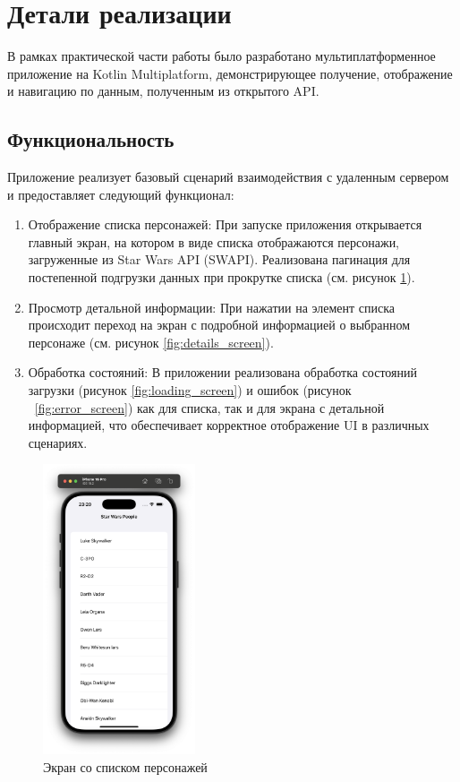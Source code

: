 \documentclass[14pt, russian]{scrartcl}
\begin{document}
\section{Детали реализации}

В рамках практической части работы было разработано мультиплатформенное приложение на Kotlin Multiplatform, демонстрирующее получение, отображение и навигацию по данным, полученным из открытого API.

\subsection{Функциональность}

Приложение реализует базовый сценарий взаимодействия с удаленным сервером и предоставляет следующий функционал:

\begin{enumerate}
    \item Отображение списка персонажей: При запуске приложения открывается главный экран, на котором в виде списка отображаются персонажи, загруженные из Star Wars API (SWAPI). Реализована пагинация для постепенной подгрузки данных при прокрутке списка (см. рисунок \ref{fig:list_screen}).
    \item Просмотр детальной информации: При нажатии на элемент списка происходит переход на экран с подробной информацией о выбранном персонаже (см. рисунок \ref{fig:details_screen}).
    \item Обработка состояний: В приложении реализована обработка состояний загрузки (рисунок \ref{fig:loading_screen}) и ошибок (рисунок ~\ref{fig:error_screen}) как для списка, так и для экрана с детальной информацией, что обеспечивает корректное отображение UI в различных сценариях.
\end{enumerate}

\begin{figure}[!htb]
    \centering
    \includegraphics[width=0.4\textwidth]{ios_list.png}
    \caption{Экран со списком персонажей}
    \label{fig:list_screen}
\end{figure}
\end{document}
